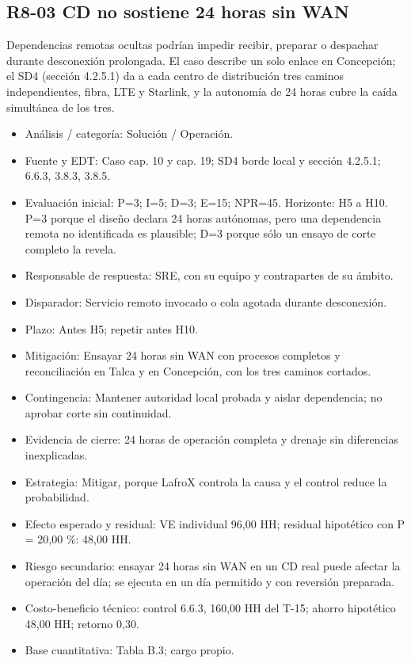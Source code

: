 \subsection*{R8-03 \textemdash{} CD no sostiene 24 horas sin WAN}

Dependencias remotas ocultas podrían impedir recibir, preparar o despachar durante desconexión prolongada. El caso describe un solo enlace en Concepción; el SD4 (sección 4.2.5.1) da a cada centro de distribución tres caminos independientes, fibra, LTE y Starlink, y la autonomía de 24 horas cubre la caída simultánea de los tres.

\begin{itemize}[leftmargin=*,itemsep=3pt]
\item Análisis / categoría: Solución / Operación.
\item Fuente y EDT: Caso cap. 10 y cap. 19; SD4 borde local y sección 4.2.5.1; 6.6.3, 3.8.3, 3.8.5.
\item Evaluación inicial: P=3; I=5; D=3; E=15; NPR=45. Horizonte: H5 a H10. P=3 porque el diseño declara 24 horas autónomas, pero una dependencia remota no identificada es plausible; D=3 porque sólo un ensayo de corte completo la revela.
\item Responsable de respuesta: SRE, con su equipo y contrapartes de su ámbito.
\item Disparador: Servicio remoto invocado o cola agotada durante desconexión.
\item Plazo: Antes H5; repetir antes H10.
\item Mitigación: Ensayar 24 horas sin WAN con procesos completos y reconciliación en Talca y en Concepción, con los tres caminos cortados.
\item Contingencia: Mantener autoridad local probada y aislar dependencia; no aprobar corte sin continuidad.
\item Evidencia de cierre: 24 horas de operación completa y drenaje sin diferencias inexplicadas.
\item Estrategia: Mitigar, porque LafroX controla la causa y el control reduce la probabilidad.
\item Efecto esperado y residual: VE individual 96,00 HH; residual hipotético con P = 20,00 \%: 48,00 HH.
\item Riesgo secundario: ensayar 24 horas sin WAN en un CD real puede afectar la operación del día; se ejecuta en un día permitido y con reversión preparada.
\item Costo-beneficio técnico: control 6.6.3, 160,00 HH del T-15; ahorro hipotético 48,00 HH; retorno 0,30.
\item Base cuantitativa: Tabla B.3; cargo propio.
\end{itemize}

